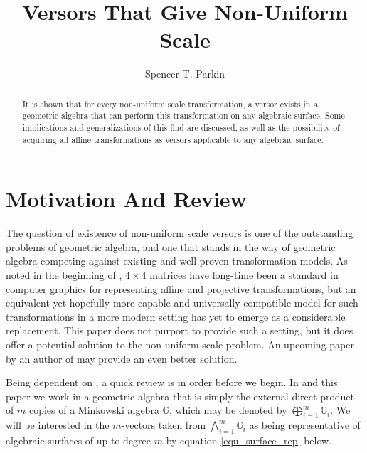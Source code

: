 \documentclass{birkjour}
\theoremstyle{definition}
\theoremstyle{remark}
\numberwithin{equation}{section}
\newcommand{\G}{\mathbb{G}}
\begin{document}
\title{Versors That Give Non-Uniform Scale}

\author{Spencer T. Parkin}
\address{102 W. 500 S., \\
Salt Lake City, UT  84101} 



\begin{abstract}
It is shown that for every non-uniform scale transformation, a versor
exists in a geometric algebra that can perform this transformation
on any algebraic surface.  Some implications and generalizations of this find are discussed,
as well as the possibility of acquiring all affine transformations as versors applicable
to any algebraic surface.
\end{abstract}


\maketitle

\section{Motivation And Review}

The question of existence of non-uniform scale versors is one of the outstanding problems of geometric algebra,
and one that stands in the way of geometric algebra competing against existing and well-proven transformation models.
As noted in the beginning of \cite{Goldman12}, $4\times 4$ matrices have long-time been a standard
in computer graphics for representing affine and projective transformations, but an
equivalent yet hopefully more capable and universally compatible model for such transformations in a more modern setting has yet to emerge
as a considerable replacement.  This paper does not purport to provide such a setting,
but it does offer a potential solution to the non-uniform scale problem.
An upcoming paper by an author of \cite{Dorst07} may provide an even better solution.

Being dependent on \cite{Parkin13}, a quick review is in order before we begin.
In \cite{Parkin13} and this paper we work in a geometric algebra that is simply
the external direct product of $m$ copies of a Minkowski algebra $\G$, which
may be denoted by $\bigoplus_{i=1}^m \G_i$.  We will be interested in the $m$-vectors
taken from $\bigwedge_{i=1}^m \G_i$ as being representative of algebraic surfaces
of up to degree $m$ by equation \eqref{equ_surface_rep} below.
\end{document}
